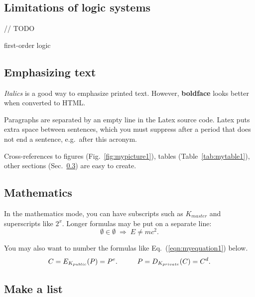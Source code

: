 \documentclass[article]{aaltoseries}
\begin{document}

\subsection{Limitations of logic systems}
\label{sec:limitations}
// TODO

first-order logic



\subsection{Emphasizing text}
\label{sec:emphasis}

\textit{Italics} is a good way to emphasize printed text. However,
\textbf{boldface} looks better when converted to HTML.

Paragraphs are separated by an empty line in the Latex source code.
Latex puts extra space between sentences, which you must suppress
after a period that does not end a sentence, e.g.\ after this acronym.

Cross-references to figures (Fig.~\ref{fig:mypicture1}), tables
(Table~\ref{tab:mytable1}), other sections (Sec.~\ref{sec:math})
are easy to create. 




\subsection{Mathematics}
\label{sec:math}

In the mathematics mode, you can have subscripts such as $K_{master}$
and superscripts like $2^x$. Longer formulas may be put on a separate
line:
\[ \emptyset \in \emptyset \; \Rightarrow \; E \neq mc^2. \]

You may also want to number the formulas like Eq.~(\ref{eqn:myequation1})
below.
\begin{equation}\label{eqn:myequation1}
C = E_{K_{public}}(P) = P^e. \hspace{10mm}   P = D_{K_{private}}(C) = C^d.
\end{equation}





\subsection{Make a list}
\label{sec:list}
\end{document}
